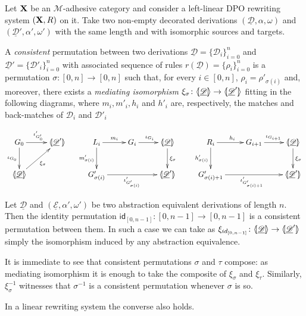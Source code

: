 \documentclass[a4paper,UKenglish,cleveref,pdftex, thm-restate,numberwithinsect,anonymous]{lipics}
\newcommand{\id}[1]{\mathsf{id}_{#1}}
\def\R{\mathsf{R}}
\def\X{\textbf {\textup{X}}}
\newcommand{\dder}[1]{\mathscr{#1}}
\newcommand{\der}[1]{\underline{\dder{#1}}}
\newcommand{\lpro}{\langle \hspace{-1.85pt}[}
\newcommand{\rpro}{]\hspace{-1.85pt}\rangle}
\newcommand{\tpro}[1]{\lpro \der{#1}\rpro}
\begin{document}
\begin{definition}
	\label{def:permcon}
	Let $\X$ be an $\mathcal{M}$-adhesive category and consider a
	left-linear DPO rewriting system $(\X, \R)$ on it.  Take two
	non-empty decorated derivations $(\der{D}, \alpha, \omega)$ and
	$(\der{D}', \alpha', \omega')$ with the same length and with
	isomorphic sources and targets.
	
	A \emph{consistent} permutation between two derivations $\der{D}=\{\dder{D}_i\}_{i=0}^n$ and
	$\der{D}'=\{\dder{D}'_i\}_{i=0}^n$ with associated sequence of rules
	$r(\der{D})=\{\rho_i\}_{i=0}^n$ is a permutation
	$\sigma\colon [0,n]\to [0,n]$ such that, for every $i\in [0,n]$,
	$\rho_i=\rho'_{\sigma(i)}$ and, moreover, there exists a
	\emph{mediating isomorphism}
	$\xi_\sigma\colon \tpro{D} \to \lpro \der{D}' \rpro$ fitting in the
	following diagrams, where $m_i, m'_i, h_i$ and $h'_i$ are,
	respectively, the matches and back-matches of $\dder{D}_i$ and
	$\dder{D}'_i$
	
	\[
	\xymatrix{
		G_0 \ar[r]^{\iota'_{G'_0}} \ar[d]_{\iota_{G_0}}& \lpro \der{D}' \rpro &L_i\ar[r]^{m_i} \ar[d]_{m'_{\sigma(i)}}& G_i \ar[r]^{\iota_{G_i}}
		&\tpro{D} \ar[d]^{\xi_\sigma} & R_i \ar[r]^{h_i}
		\ar[d]_{h'_{\sigma(i)}}& G_{i+1} \ar[r]^{\iota_{G_{i+1}}}
		&\tpro{D} \ar[d]^{\xi_\sigma} \\\tpro{D} \ar[ur]_{\xi_\sigma}&&G'_{\sigma(i)}
		\ar[rr]_{\iota'_{G'_{\sigma(i)}}}&& \lpro \der{D}' \rpro&
		G'_{\sigma(i)+1} \ar[rr]_{\iota'_{G'_{\sigma(i)+1}}}&& \lpro
		\der{D}' \rpro}
	\]
\end{definition}


\begin{remark}\label{rem:abs}
	Let $\der{D}$ and $(\der{E}, \alpha', \omega')$ be two abstraction equivalent derivations of length $n$. Then the identity permutation $\id{[0,n-1]}\colon [0,n-1]\to [0,n-1]$ is a consistent permutation between them. In such a case we can take as $\xi_{\id{[0,n-1]}}\colon \tpro{D}\to \lpro \der{D}'\rpro$ simply the isomorphism induced by any abstraction equivalence.
\end{remark}

\begin{remark}\label{rem:compo}
	It is immediate to see that consistent permutations $\sigma$ and $\tau$ compose: as mediating isomorphism it is enough to take the composite of $\xi_{\sigma}$ and $\xi_\tau$. Similarly, $\xi^{-1}_{\sigma}$ witnesses that $\sigma^{-1}$ is a consistent permutation whenever $\sigma$ is so.
\end{remark}
In a linear rewriting system the converse also holds.
\end{document}
